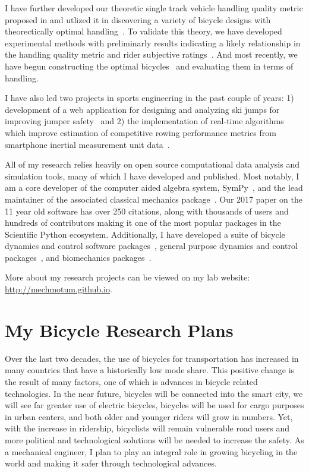 \documentclass{article}
\begin{document}
I have further developed our theoretic single track vehicle handling quality
metric proposed in \cite{Hess2012} and utlized it in discovering a variety of
bicycle designs with theorectically optimal
handling~\cite{Moore2016,Moore2019a}. To validate this theory, we have
developed experimental methods with preliminarly results indicating a likely
relationship in the handling quality metric and rider subjective
ratings~\cite{Kresie}. And most recently, we have begun constructing the
optimal bicycles~\cite{Gilboa2019a} and evaluating them in terms of handling.

I have also led two projects in sports engineering in the past couple of years:
1) development of a web application for designing and analyzing ski jumps for
improving jumper safety~\cite{Moore2018a,Cloud2019a} and 2) the implementation
of real-time algorithms which improve estimation of competitive rowing
performance metrics from smartphone inertial measurement unit
data~\cite{Cloud2019b}.

All of my research relies heavily on open source computational data analysis
and simulation tools, many  of which I have developed and published. Most
notably, I am a core developer of the computer aided algebra system,
SymPy~\cite{SymPyDevelopmentTeam2006}, and the lead maintainer of the associated
classical mechanics package~\cite{Gede2013}. Our 2017 paper \cite{Meurer2017}
on the 11 year old software has over 250 citations, along with thousands of
users and hundreds of contributors making it one of the most popular packages
in the Scientific Python ecosystem. Additionally, I have developed a suite of
bicycle dynamics and control software
packages~\cite{Moore2010b,Moore2011d,Moore2011a,Moore2011e}, general purpose
dynamics and control packages~\cite{Moore2014,Moore2011}, and biomechanics
packages~\cite{Dembia2011,Moore2011,Moore2011b,Moore2013b}.

More about my research projects can be viewed on my lab website:
\url{http://mechmotum.github.io}.

\section*{My Bicycle Research Plans}
%
Over the last two decades, the use of bicycles for transportation has increased
in many countries that have a historically low mode share. This positive change
is the result of many factors, one of which is advances in bicycle related
technologies. In the near future, bicycles will be connected into the smart
city, we will see far greater use of electric bicycles, bicycles will be used
for cargo purposes in urban centers, and both older and younger riders will
grow in numbers. Yet, with the increase in ridership, bicyclists will remain
vulnerable road users and more political and technological solutions will be
needed to increase the safety. As a mechanical engineer, I plan to play an
integral role in growing bicycling in the world and making it safer through
technological advances.
\end{document}

